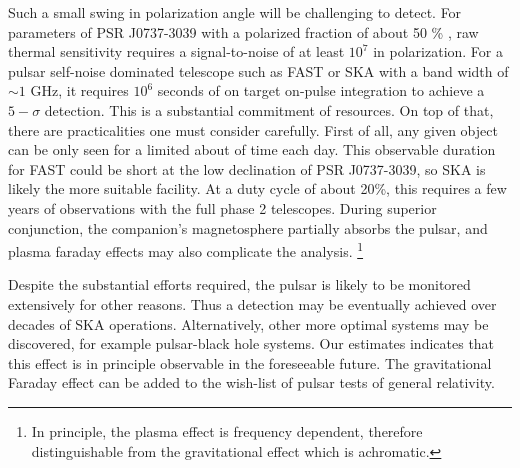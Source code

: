 \documentclass[aps,showpacs,twocolumn,floats,prd,superscriptaddress,nofootinbib]{revtex4-1}
\begin{document}
Such a small swing in polarization angle will be challenging to detect.
For parameters of PSR J0737-3039 with a polarized fraction of about 50
\% \cite{2004ApJ...615L.137D}, raw thermal sensitivity requires a
signal-to-noise of at least $10^7$ in polarization.  
For a pulsar self-noise dominated telescope such as FAST \cite{FAST} or SKA \cite{SKA} with a band width of $\sim 1$ GHz, it requires $10^6$ seconds of on target on-pulse integration to achieve a $5-\sigma$ detection.
This is a substantial commitment of resources.  
On top of that, there are practicalities one must consider carefully.
First of all, any given object can be only seen for a limited about of time each day.
This observable duration for FAST could be short at the low declination of PSR J0737-3039, so SKA is likely the more suitable facility. 
At a duty cycle of about 20\%, this requires a few years of observations with the full phase 2 telescopes.  
During superior conjunction, the companion's magnetosphere partially absorbs the pulsar, and plasma faraday effects may also complicate the analysis.
\footnote{In principle, the plasma effect is frequency dependent, therefore distinguishable from the gravitational effect which is achromatic.} 

Despite the substantial efforts required, the pulsar is likely to be monitored extensively for other reasons.
Thus a detection may be eventually achieved over decades of SKA operations.  
Alternatively, other more optimal systems may be discovered, for example pulsar-black hole systems.  
Our estimates indicates that this effect is in principle observable in the foreseeable future.  
The gravitational Faraday effect can be added to the wish-list of pulsar tests of general relativity.

\newcommand{\apjl}{ApJ}      %



\end{document}
